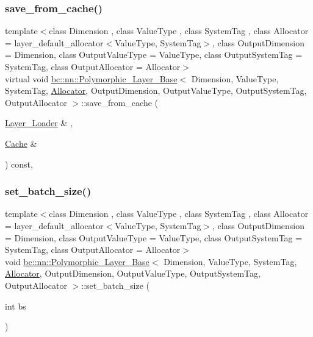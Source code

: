 \subsubsection{\texorpdfstring{save\+\_\+from\+\_\+cache()}{save\_from\_cache()}\hspace{0.1cm}{\footnotesize\ttfamily [2/2]}}
{\footnotesize\ttfamily template$<$class Dimension , class Value\+Type , class System\+Tag , class Allocator  = layer\+\_\+default\+\_\+allocator$<$\+Value\+Type, System\+Tag$>$, class Output\+Dimension  = Dimension, class Output\+Value\+Type  = Value\+Type, class Output\+System\+Tag  = System\+Tag, class Output\+Allocator  = Allocator$>$ \\
virtual void \hyperlink{structbc_1_1nn_1_1Polymorphic__Layer__Base}{bc\+::nn\+::\+Polymorphic\+\_\+\+Layer\+\_\+\+Base}$<$ Dimension, Value\+Type, System\+Tag, \hyperlink{classbc_1_1allocators_1_1Allocator}{Allocator}, Output\+Dimension, Output\+Value\+Type, Output\+System\+Tag, Output\+Allocator $>$\+::save\+\_\+from\+\_\+cache (\begin{DoxyParamCaption}\item[{\hyperlink{structbc_1_1nn_1_1Layer__Loader}{Layer\+\_\+\+Loader} \&}]{,  }\item[{\hyperlink{structbc_1_1nn_1_1Cache}{Cache} \&}]{ }\end{DoxyParamCaption}) const\hspace{0.3cm}{\ttfamily [inline]}, {\ttfamily [virtual]}}

\mbox{\label{structbc_1_1nn_1_1Polymorphic__Layer__Base_a4d11290c40096f27144a6ec9fa976b12}} 
\subsubsection{\texorpdfstring{set\+\_\+batch\+\_\+size()}{set\_batch\_size()}\hspace{0.1cm}{\footnotesize\ttfamily [1/2]}}
{\footnotesize\ttfamily template$<$class Dimension , class Value\+Type , class System\+Tag , class Allocator  = layer\+\_\+default\+\_\+allocator$<$\+Value\+Type, System\+Tag$>$, class Output\+Dimension  = Dimension, class Output\+Value\+Type  = Value\+Type, class Output\+System\+Tag  = System\+Tag, class Output\+Allocator  = Allocator$>$ \\
void \hyperlink{structbc_1_1nn_1_1Polymorphic__Layer__Base}{bc\+::nn\+::\+Polymorphic\+\_\+\+Layer\+\_\+\+Base}$<$ Dimension, Value\+Type, System\+Tag, \hyperlink{classbc_1_1allocators_1_1Allocator}{Allocator}, Output\+Dimension, Output\+Value\+Type, Output\+System\+Tag, Output\+Allocator $>$\+::set\+\_\+batch\+\_\+size (\begin{DoxyParamCaption}\item[{int}]{bs }\end{DoxyParamCaption})\hspace{0.3cm}{\ttfamily [inline]}}

